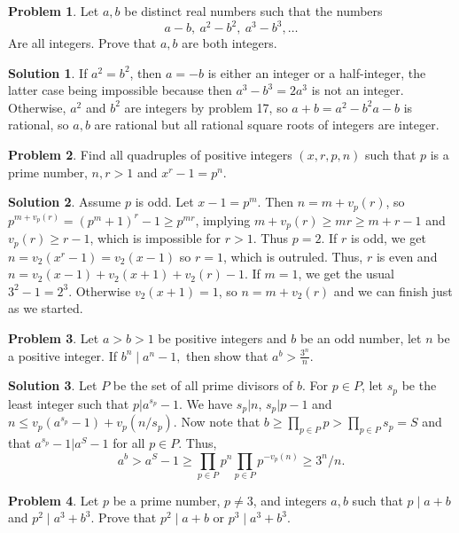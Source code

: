 \documentclass{article}
\theoremstyle{definition}
\newtheorem{problem}{Problem}
\newtheorem*{solution}{Solution}
\begin{document}
\begin{problem}
Let $a,b$ be distinct real numbers such that the numbers
$$a-b, \ a^2-b^2 , \ a^3-b^3 , \ldots$$
Are all integers. Prove that $a,b$ are both integers.
\end{problem}

\begin{solution}
If $a^2=b^2$, then $a=-b$ is either an integer or a half-integer, the latter case being impossible because then $a^3-b^3=2a^3$ is not an integer. Otherwise, $a^2$ and $b^2$ are integers by problem 17, so $a+b={a^2-b^2}{a-b}$ is rational, so $a,b$ are rational but all rational square roots of integers are integer.
\end{solution}

\begin{problem}
Find all quadruples of positive integers $(x,r,p,n)$ such that $p$ is a prime number, $n,r>1$ and $x^{r} - 1 = p^{n} .$
\end{problem}

\begin{solution}
Assume $p$ is odd. Let $x-1=p^m$. Then $n=m+v_p(r)$, so $p^{m+v_p(r)}=(p^m+1)^r-1\ge p^{mr}$, implying $m+v_p(r)\ge mr\ge m+r-1$ and $v_p(r)\ge r-1$, which is impossible for $r>1$.
Thus $p=2$. If $r$ is odd, we get $n=v_2(x^r-1)=v_2(x-1)$ so $r=1$, which is outruled. Thus, $r$ is even and $n=v_2(x-1)+v_2(x+1)+v_2(r)-1$. If $m=1$, we get the usual $3^2-1=2^3$. Otherwise $v_2(x+1)=1$, so $n=m+v_2(r)$ and we can finish just as we started.
\end{solution}

\begin{problem}
Let $ a > b > 1$ be positive integers and $b$ be an odd number, let $ n$ be a positive integer. If $ b^n \mid a^n-1,$ then show that $ a^b > \frac {3^n}{n}.$
\end{problem}

\begin{solution}
Let $P$ be the set of all prime divisors of $b$. For $p\in P$, let $s_p$ be the least integer such that $p|a^{s_p}-1$. We have $s_p|n$, $s_p|p-1$ and $n\le v_p(a^{s_p}-1)+v_p(n/s_p)$. Now note that
$b\ge\prod_{p\in P} p>\prod_{p\in P} s_p=S$ and that $a^{s_p}-1|a^S-1$ for all $p\in P$. Thus,
$$a^b>a^S-1\ge \prod_{p\in P}p^n \prod_{p\in P}p^{-v_p(n)}\ge 3^n/n.$$
\end{solution}

\begin{problem}
Let $ p$ be a prime number, $ p\neq 3$, and integers $ a,b$ such that $ p\mid a + b$ and $ p^2 \mid a^3 + b^3$. Prove that $ p^2 \mid a + b$ or $ p^3 \mid a^3 + b^3$.
\end{problem}
\end{document}
